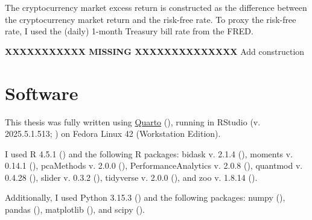 \documentclass[
  12pt,
  a4paper,
  openany]{scrbook}
\begin{document}
The cryptocurrency market excess return is constructed as the difference
between the cryptocurrency market return and the risk-free rate. To
proxy the risk-free rate, I used the (daily) 1-month Treasury bill rate
from the FRED.

\textbf{XXXXXXXXXXX MISSING XXXXXXXXXXXXXX} Add construction

\section{Software}\label{sec-software}

This thesis was fully written using \href{https://quarto.org/}{Quarto}
(), running in RStudio
(v. 2025.5.1.513; ) on Fedora
Linux 42 (Workstation Edition).

I used R 4.5.1 () and the
following R packages: bidask v. 2.1.4 (), moments v. 0.14.1 (), pcaMethods v. 2.0.0
(),
PerformanceAnalytics v. 2.0.8
(), quantmod
v. 0.4.28 (), slider v.
0.3.2 (), tidyverse v. 2.0.0
(), and zoo v. 1.8.14
().

Additionally, I used Python 3.15.3 () and the following packages: numpy
(), pandas
(),
matplotlib (), and scipy
().


\backmatter
\end{document}

